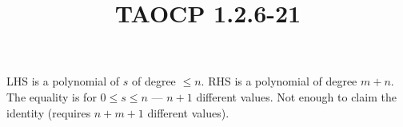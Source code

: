 \documentclass{article}
\title{TAOCP 1.2.6\mbox{-}21}
\begin{document}
\maketitle

LHS is a polynomial of \( s \) of degree \( \leq n \). RHS is a polynomial of degree \( m + n \). The equality is for \( 0 \leq s \leq n \) --- \( n + 1 \) different values. Not enough to claim the identity (requires \( n + m + 1 \) different values).
\end{document}
